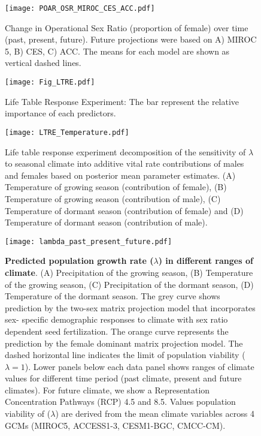 \documentclass[9pt,twoside,lineno]{pnas-new}
\begin{document}
\begin{figure}
\centering
\texttt{[image: POAR\_OSR\_MIROC\_CES\_ACC.pdf]}
\caption{Change in Operational Sex Ratio (proportion of female) over time (past, present, future).
			Future projections were based on A) MIROC 5, B) CES, C) ACC.
			The means for each model are shown as vertical dashed lines.}
\label{Sup:osrall}
\end{figure}

\begin{figure}
\centering
\texttt{[image: Fig\_LTRE.pdf]}
\caption{Life Table Response Experiment: The bar represent the relative importance of each predictors.}
\label{Sup:LTRE}
\end{figure}

\begin{figure}
\centering
\texttt{[image: LTRE\_Temperature.pdf]}
\caption{Life table response experiment decomposition of the sensitivity of $\lambda$ to seasonal climate into additive vital rate contributions of males and females based on posterior mean parameter estimates.
			(A) Temperature of growing season (contribution of female), (B) Temperature of growing season (contribution of male),  (C) Temperature of dormant season (contribution of female) and (D) Temperature of dormant season (contribution of male).}
		\label{Sup:LTRETemp}
\end{figure}

\begin{figure}
\centering
\texttt{[image: lambda\_past\_present\_future.pdf]}
\caption{\textbf{Predicted population growth rate ($\lambda$) in different ranges of climate}.
			(A) Precipitation of the growing season, (B) Temperature of the growing season, (C) Precipitation of the dormant season, (D) Temperature of the dormant season.
			The grey curve shows prediction by the two-sex matrix projection model that incorporates sex- specific demographic responses to climate with sex ratio dependent seed fertilization.
			The orange curve represents the prediction by the female dominant matrix projection model.
			The dashed horizontal line indicates the limit of population viability ($\lambda = 1$).
			Lower panels below each data panel shows  ranges of climate values for different time period (past climate, present and future climates).
			For future climate, we show a Representation Concentration Pathways (RCP) 4.5 and 8.5. Values population viability of ($\lambda$) are derived from the mean climate variables across 4 GCMs (MIROC5, ACCESS1-3, CESM1-BGC, CMCC-CM).
		}
\label{fig:lambda_LTRE}
\end{figure}
\end{document}
